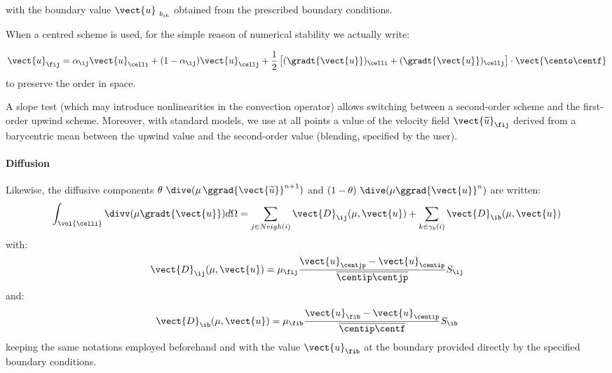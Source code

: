 with the boundary value ${\vect{u}_{\ {b}_{ik}}}$ obtained from the prescribed
boundary conditions.

\begin{remark}
When a centred scheme is used, for the simple reason of numerical stability
we actually write:

\begin{equation*}
\vect{u}_{\fij} = \alpha_{\ij} \vect{u}_{\celli} +  (1-\alpha_{\ij})
\vect{u}_{\cellj} +
\frac{1}{2}\left[(\gradt{\vect{u}})_\celli + (\gradt{\vect{u}})_\cellj \right] \cdot \vect{\cento \centf}
\end{equation*}
to preserve the order in space.
\end{remark}

\begin{remark}
A slope test (which may introduce nonlinearities in the convection operator)
allows switching between a second-order scheme and the first-order upwind scheme.
Moreover, with standard models, we use at all points a value of the velocity field
$\vect{\widetilde{u}}_{\fij}$ derived from a barycentric mean between the upwind
value and the second-order value (blending, specified by the user).
\end{remark}

\paragraph{Diffusion\\}
Likewise, the diffusive components $\theta\,\,\dive(\mu\,\ggrad{\vect{\widetilde{u}}}^{n+1})$ and $(1-\theta)\,\,\dive(\mu \ggrad{\vect{u}}^{n})$ are written:
\begin{equation*}
\int_{\vol{\celli}}{\divv(\mu \gradt{\vect{u}}) d\Omega} =
\sum_{j\in Neigh(i)}{\vect{D}_{\ij}(\mu, \vect{u})}
+\sum_{k\in {\gamma_b(i)}} {\vect{D}_{\ib}}(\mu,\vect{u})
\end{equation*}
with:
\begin{equation}
\vect{D}_{\ij}(\mu, \vect{u}) = \mu_{\fij}
\frac{\vect{u}_{\centjp}-\vect{u}_{\centip}}{ \overline{\centip \centjp}} S_{\ij}
\end{equation}
and:
\begin{equation}
\vect{D}_{\ib}(\mu, \vect{u}) = \mu_{\fib}
\dfrac{\vect{u}_{\fib}-\vect{u}_{\centip}}{\overline{\centip \centf}} S_{\ib}
\end{equation}
keeping the same notations employed beforehand and with the value
${\vect{u}_{\fib}}$ at the boundary provided directly by the specified
boundary conditions.

